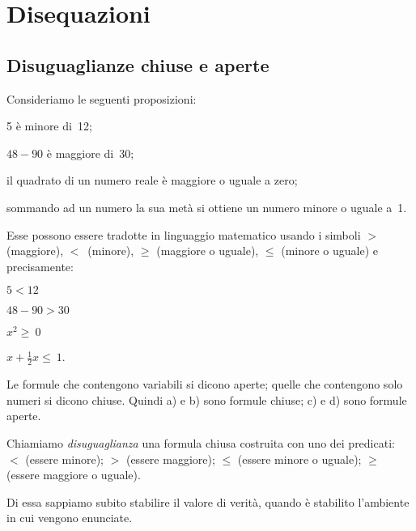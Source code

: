 
\chapter{Disequazioni}

\section{Disuguaglianze chiuse e aperte}
\label{sec:dis_disguagianze}

Consideriamo le seguenti proposizioni:

\begin{enumeratea}
\item 5 è minore di~12;
\item $48-90$ è maggiore di~30;
\item il quadrato di un numero reale è maggiore o uguale a zero;
\item sommando ad un numero la sua metà si ottiene un numero minore
o uguale a~1.
\end{enumeratea}

Esse possono essere tradotte in linguaggio matematico usando i simboli
$>$ (maggiore), $<$~(minore), ${\geq}$ (maggiore o uguale), ${\leq}$ 
(minore o uguale) e precisamente:

\begin{multicols}{4}
 \begin{enumeratea}
\item $5<12$
\item $48-90>30$
\item $x^{2}\ge~0$
\item $x+\frac{1}{2}x\le~1$.
 \end{enumeratea}
\end{multicols}

Le formule che contengono variabili si dicono aperte; quelle che
contengono solo numeri si dicono chiuse. Quindi a) e b) sono formule
chiuse; c) e d) sono formule aperte.

\begin{definizione}
Chiamiamo \emph{disuguaglianza} una formula chiusa
costruita con uno dei predicati:~$<$ (essere minore);
$>$ (essere maggiore); ${\leq}$ (essere minore o uguale);
${\geq}$ (essere maggiore o uguale).
\end{definizione}

Di essa sappiamo subito stabilire il valore di verità, quando è
stabilito l'ambiente in cui vengono enunciate.

